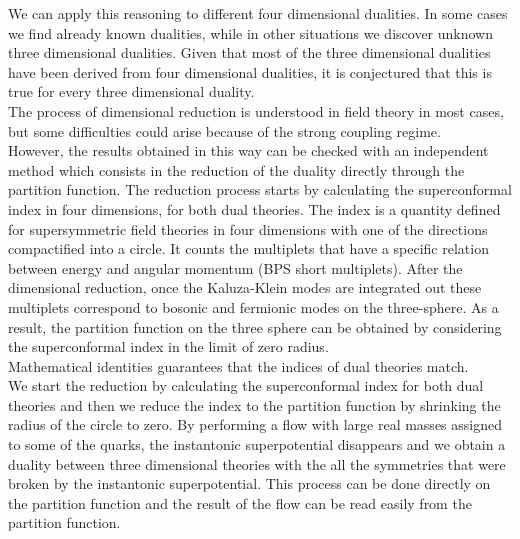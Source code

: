We can apply this reasoning to different four dimensional dualities. 
In some cases we find already known dualities, while in other situations we discover unknown three dimensional dualities. 
Given that most of the three dimensional dualities have been derived from four dimensional dualities, it is conjectured that this is true for every three dimensional duality.\\

The process of dimensional reduction is understood in field theory in most cases, but some difficulties could arise because of the strong coupling regime.\\
However, the results obtained in this way can be checked with an independent method which consists in the reduction of the duality directly through the partition function.
The reduction process starts by calculating the superconformal index in four dimensions, for both dual theories. 
The index is a quantity defined for supersymmetric field theories in four dimensions with one of the directions compactified into a circle.
It counts the multiplets that have a specific relation between energy and angular momentum (BPS short multiplets). 
After the dimensional reduction, once the Kaluza-Klein modes are integrated out these multiplets correspond to bosonic and fermionic modes on the three-sphere.  
As a result, the partition function on the three sphere can be obtained by considering the superconformal index in the limit of zero radius.\\
Mathematical identities guarantees that the indices of dual theories match.\\

We start the reduction by calculating the superconformal index for both dual theories and then we reduce the index to the partition function by shrinking the radius of the circle to zero.
By performing a flow with large real masses assigned to some of the quarks, the instantonic superpotential disappears and we obtain a duality between three dimensional theories with the all the symmetries that were broken by the instantonic superpotential.
This process can be done directly on the partition function and the result of the flow can be read easily from the partition function.\\

